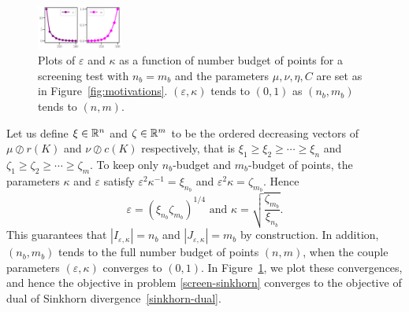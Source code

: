 \begin{figure}
\vspace{-12pt}
\centering
\includegraphics[width=0.25\textwidth]{./figs/kappa_epsilon.pdf}
\caption{Plots of $\varepsilon$ and $\kappa$ as a function of number budget of points for a screening test with $n_b=m_b$ and the parameters $\mu, \nu, \eta, C$ are set as in Figure~\eqref{fig:motivations}.  $(\varepsilon, \kappa)$ tends to $(0,1)$ as $(n_b,m_b)$ tends to $(n,m)$.}
\label{fig:kappa_epsilon}
\vspace{-15pt}
\end{figure}
Let us define $\xi \in {\mathbb{R}}^n$ and $\zeta \in {\mathbb{R}}^m$ to be the ordered decreasing vectors of $\mu \oslash r(K)$ and $\nu \oslash c(K)$ respectively, that is $\xi_1 \geq \xi_2 \geq \cdots \geq \xi_n$ and $\zeta_1 \geq \zeta_2 \geq \cdots \geq \zeta_m$.
To keep only $n_b$-budget and $m_b$-budget of points, the parameters $\kappa$ and $\varepsilon$ satisfy ${\varepsilon^2}\kappa^{-1} = \xi_{n_b}$ and $\varepsilon^2\kappa = \zeta_{m_b}$. Hence 
\begin{equation}
\label{epsilon_kappa}
 \varepsilon = (\xi_{n_b}\zeta_{m_b})^{1/4} \text{ and } \kappa = \sqrt{\frac{\zeta_{m_b}}{\xi_{n_b}}}.
\end{equation}
This guarantees that $|I_{\varepsilon, \kappa}| = n_b$ and $|J_{\varepsilon, \kappa}| = m_b$ by construction. In addition,  $(n_b,m_b)$ tends to the full number budget of points $(n,m)$, when the couple parameters $(\varepsilon, \kappa)$ converges to $(0,1)$. 
In Figure~\ref{fig:kappa_epsilon}, we plot these convergences, and hence the objective in problem \eqref{screen-sinkhorn} converges to the objective of dual of Sinkhorn divergence~\eqref{sinkhorn-dual}.


